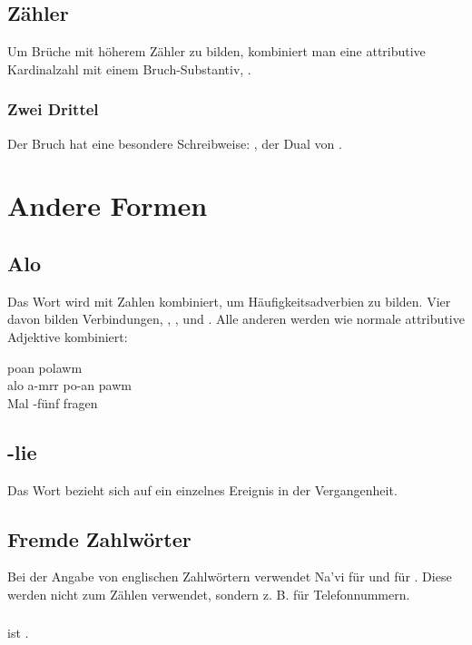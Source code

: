 \subsection{Zähler} Um Brüche mit höherem Zähler zu bilden, kombiniert man eine attributive Kardinalzahl mit einem Bruch-Substantiv,  .

\subsubsection{Zwei Drittel} Der Bruch  hat eine besondere Schreibweise: , der Dual von . 

\section{Andere Formen}

\subsection{Alo} Das Wort   wird mit Zahlen kombiniert, um Häufigkeitsadverbien zu bilden. Vier davon bilden Verbindungen,  ,  ,   und  . Alle anderen werden wie normale attributive Adjektive kombiniert:

\begin{interlin}
	\glll \Npawl{}  poan polawm \\
	alo a-mrr po-an pawm \\
	Mal -fünf  fragen \\
\end{interlin}

\subsection{-lie} Das Wort  bezieht sich auf ein einzelnes Ereignis in der Vergangenheit. 

\subsection{Fremde Zahlwörter} Bei der Angabe von englischen Zahlwörtern verwendet Na'vi  für  und  für . Diese werden nicht zum Zählen verwendet, sondern z. B. für Telefonnummern. 

\subsubsection{}  ist . 
